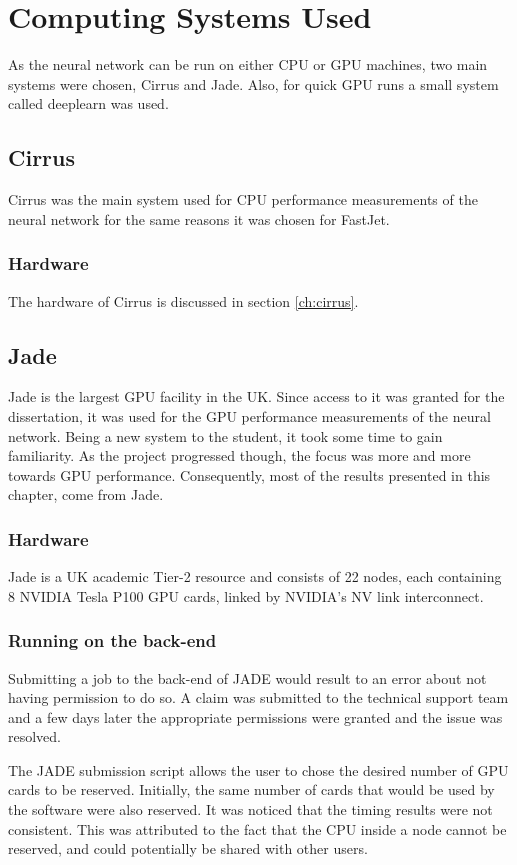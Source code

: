 \section{Computing Systems Used}\label{ch:nnwhere}
As the neural network can be run on either CPU or GPU machines, two main systems were chosen, Cirrus and Jade. Also, for quick GPU runs a small system called deeplearn was used.
    \subsection{Cirrus}
    Cirrus was the main system used for CPU performance measurements of the neural network for the same reasons it was chosen for FastJet.
        \subsubsection{Hardware}
        The hardware of Cirrus is discussed in section \ref{ch:cirrus}. 

    \subsection{Jade}
    Jade is the largest GPU facility in the UK. Since access to it was granted for the dissertation, it was used for the GPU performance measurements of the neural network. Being a new system to the student, it took some time to gain familiarity. As the project progressed though, the focus was more and more towards GPU performance. Consequently, most of the results presented in this chapter, come from Jade. 
        \subsubsection{Hardware}
        Jade\cite{jade1} is a UK academic Tier-2 resource and consists of 22 nodes, each containing 8 NVIDIA Tesla P100 GPU cards, linked by NVIDIA's NV link interconnect.  
    
        \subsubsection{Running on the back-end}
        Submitting a job to the back-end of JADE would result to an error about not having permission to do so. A claim was submitted to the technical support team and a few days later the appropriate permissions were granted and the issue was resolved.
        
        The JADE submission script allows the user to chose the desired number of GPU cards to be reserved. Initially, the same number of cards that would be used by the software were also reserved. It was noticed that the timing results were not consistent. This was attributed to the fact that the CPU inside a node cannot be reserved, and could potentially be shared with other users. 
        
